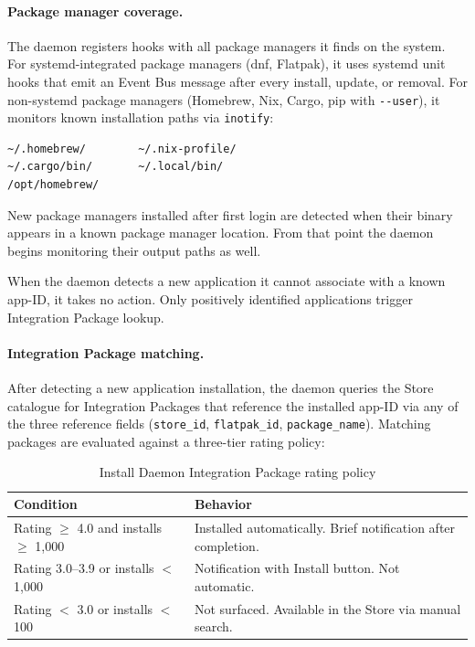 \paragraph{Package manager coverage.}
The daemon registers hooks with all package managers it finds on the system.
For systemd-integrated package managers (dnf, Flatpak), it uses systemd unit
hooks that emit an Event Bus message after every install, update, or removal.
For non-systemd package managers (Homebrew, Nix, Cargo, pip with
\texttt{-{}-user}), it monitors known installation paths via
\texttt{inotify}:

\begin{lstlisting}[language=bash, caption={Monitored installation paths}]
~/.homebrew/        ~/.nix-profile/
~/.cargo/bin/       ~/.local/bin/
/opt/homebrew/
\end{lstlisting}

New package managers installed after first login are detected when their binary
appears in a known package manager location. From that point the daemon begins
monitoring their output paths as well.

When the daemon detects a new application it cannot associate with a known
app-ID, it takes no action. Only positively identified applications trigger
Integration Package lookup.

\paragraph{Integration Package matching.}
After detecting a new application installation, the daemon queries the Store
catalogue for Integration Packages that reference the installed app-ID via
any of the three reference fields (\texttt{store\_id}, \texttt{flatpak\_id},
\texttt{package\_name}). Matching packages are evaluated against a three-tier
rating policy:

\begin{table}[htbp]
\caption{Install Daemon Integration Package rating policy}
\label{tab:install-rating}
\begin{tabularx}{\linewidth}{lX}
\toprule
\textbf{Condition} & \textbf{Behavior} \\
\midrule
Rating $\geq$ 4.0 and installs $\geq$ 1{,}000 &
  Installed automatically. Brief notification after completion. \\
Rating 3.0--3.9 or installs $<$ 1{,}000 &
  Notification with Install button. Not automatic. \\
Rating $<$ 3.0 or installs $<$ 100 &
  Not surfaced. Available in the Store via manual search. \\
\bottomrule
\end{tabularx}
\end{table}

